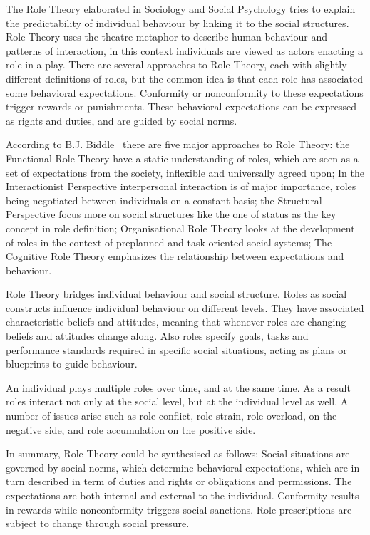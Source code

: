 \documentclass[a4paper,12pt,oneside,fleqn]{book} %
\theoremstyle{plain}
\theoremstyle{definition}
\theoremstyle{remark}
\begin{document}
The Role Theory elaborated in Sociology and Social Psychology tries to
explain the predictability of individual behaviour by linking it to the
social structures. Role Theory uses the theatre metaphor to describe human
behaviour and patterns of interaction, in this context individuals are
viewed as actors enacting a role in a play. There are several approaches to
Role Theory, each with slightly different definitions of roles, but the
common idea is that each role has associated some behavioral expectations.
Conformity or nonconformity to these expectations trigger rewards or
punishments. These behavioral expectations can be expressed as rights and
duties, and are guided by social norms.

According to B.J. Biddle~\cite{} there are five major approaches to Role
Theory: the Functional Role Theory have a static understanding of roles,
which are seen as a set of expectations from the society, inflexible and
universally agreed upon; In the Interactionist Perspective interpersonal
interaction is of major importance, roles being negotiated between
individuals on a constant basis; the Structural Perspective focus more on
social structures like the one of status as the key concept in role
definition; Organisational Role Theory looks at the development of roles in
the context of preplanned and task oriented social systems; The Cognitive
Role Theory emphasizes the relationship between expectations and behaviour.

Role Theory bridges individual behaviour and social structure. Roles as
social constructs influence individual behaviour on different levels. They
have associated characteristic beliefs and attitudes, meaning that whenever
roles are changing beliefs and attitudes change along. Also roles specify
goals, tasks and performance standards required in specific social
situations, acting as plans or blueprints to guide behaviour.

An individual plays multiple roles over time, and at the same time. As a
result roles interact not only at the social level, but at the individual
level as well. A number of issues arise such as role conflict, role strain,
role overload, on the negative side, and role accumulation on the positive
side.

In summary, Role Theory could be synthesised as follows: Social situations
are governed by social norms, which determine behavioral expectations,
which are in turn described in term of duties and rights or obligations and
permissions. The expectations are both internal and external to the
individual. Conformity results in rewards while nonconformity triggers
social sanctions. Role prescriptions are subject to change through social
pressure.
\end{document}
